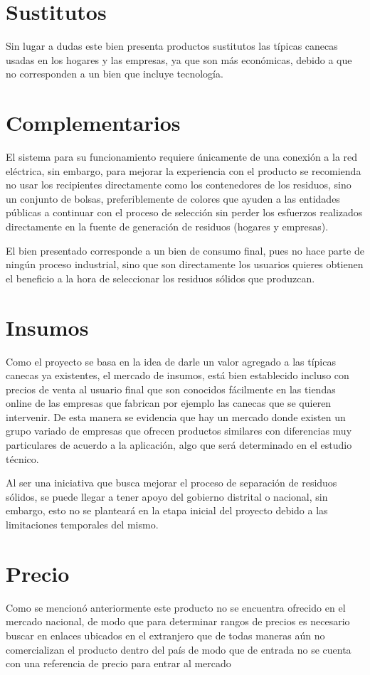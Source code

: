 \documentclass[letterpaper,12pt]{scrreprt}
\begin{document}
    \section{Sustitutos}
    Sin lugar a dudas este bien presenta productos sustitutos las típicas canecas usadas en los hogares y las empresas, ya que son más económicas, debido a que no corresponden a un bien que incluye tecnología.

    \section{Complementarios}
    El sistema para su funcionamiento requiere únicamente de una conexión a la red eléctrica, sin embargo, para mejorar la experiencia con el producto se recomienda no usar los recipientes directamente como los contenedores de los residuos, sino un conjunto de bolsas, preferiblemente de colores que ayuden a las entidades públicas a continuar con el proceso de selección sin perder los esfuerzos realizados directamente en la fuente de generación de residuos (hogares y empresas).

    El bien presentado corresponde a un bien de consumo final, pues no hace parte de ningún proceso industrial, sino que son directamente los usuarios quieres obtienen el beneficio a la hora de seleccionar los residuos sólidos que produzcan.

    \section{Insumos}

    Como el proyecto se basa en la idea de darle un valor agregado a las típicas canecas ya existentes, el mercado de insumos, está bien establecido incluso con precios de venta al usuario final que son conocidos fácilmente en las tiendas online de las empresas que fabrican por ejemplo las canecas que se quieren intervenir. De esta manera se evidencia que hay un mercado donde existen un grupo variado de empresas que ofrecen productos similares con diferencias muy particulares de acuerdo a la aplicación, algo que será determinado en el estudio técnico.

    Al ser una iniciativa que busca mejorar el proceso de separación de residuos sólidos, se puede llegar a tener apoyo del gobierno distrital o nacional, sin embargo, esto no se planteará en la etapa inicial del proyecto debido a las limitaciones temporales del mismo.

    \section{Precio}
Como se mencionó anteriormente este producto no se encuentra ofrecido en el mercado nacional, de modo que para determinar rangos de precios es necesario buscar en enlaces ubicados en el extranjero que de todas maneras aún no comercializan el producto dentro del país de modo que de entrada no se cuenta con una referencia de precio para entrar al mercado
\end{document}
